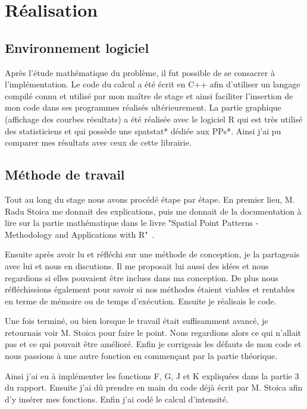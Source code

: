 \documentclass[stage2a]{tnreport}
\begin{document}
\newpage


\chapter{Réalisation}

\section{Environnement logiciel}
Après l'étude mathématique du problème, il fut possible de se consacrer à l'implémentation. Le code du calcul a été écrit en C++ afin d'utiliser un langage compilé connu et utilisé par mon maître de stage et ainsi faciliter l'insertion de mon code dans ses programmes réalisés ultérieurement. La partie graphique (affichage des courbes résultats) a été réalisée avec le logiciel R qui est très utilisé des statisticiens et qui possède une \gls{spatstat}* dédiée aux \gls{PP}s*. Ainsi j'ai pu comparer mes résultats avec ceux de cette librairie.\\

\section{Méthode de travail}

Tout au long du stage nous avons procédé étape par étape. En premier lieu, M. Radu Stoica me donnait des explications, puis me donnait de la documentation à lire sur la partie mathématique dans le livre "Spatial Point Patterns - Methodology and Applications with R"~\cite{BaddEtal16}. 

Ensuite après avoir lu et réfléchi sur une méthode de conception, je la partageais avec lui et nous en discutions. Il me proposait lui aussi des idées et nous regardions si elles pouvaient être inclues dans ma conception. De plus nous réfléchissions également pour savoir si nos méthodes étaient viables et rentables en terme de mémoire ou de temps d'exécution. Ensuite je réalisais le code.

Une fois terminé, ou bien lorsque le travail était suffisamment avancé, je retournais voir M. Stoica pour faire le point. Nous regardions alors ce qui n'allait pas et ce qui pouvait être amélioré. Enfin je corrigeais les défauts de mon code et nous passions à une autre fonction en commençant par la partie théorique.

Ainsi j'ai eu à implémenter les fonctions F, G, J et K expliquées dans la partie 3 du rapport. Ensuite j'ai dû prendre en main du code déjà écrit par M. Stoica afin d'y insérer mes fonctions. Enfin j'ai codé le calcul d'intensité.
\end{document}
